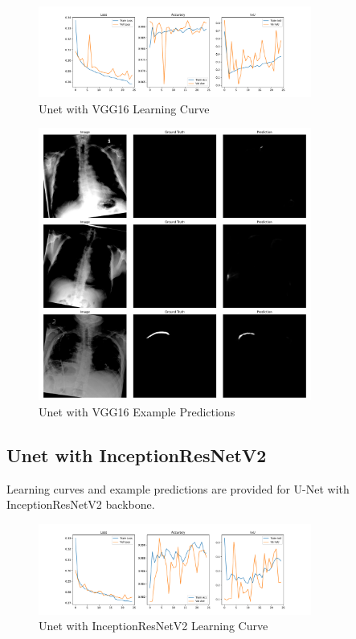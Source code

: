 \documentclass{article}
\begin{document}
\begin{figure}[H]
    \centering
    \includegraphics[width=0.8\textwidth]{plots/uvg.pdf}
    \caption{Unet with VGG16 Learning Curve}
    \label{fig:unet_vgg16}
\end{figure}

\begin{figure}[H]
    \centering
    \includegraphics[width=0.8\textwidth]{plots/uvgp.pdf}
    \caption{Unet with VGG16 Example Predictions}
    \label{fig:unet_vgg16_p}
\end{figure}

\subsection*{Unet with InceptionResNetV2}
Learning curves and example predictions are provided for U-Net with InceptionResNetV2 backbone.

\begin{figure}[H]
    \centering
    \includegraphics[width=0.8\textwidth]{plots/uinc.pdf}
    \caption{Unet with InceptionResNetV2 Learning Curve}
    \label{fig:unet_inception_resnetv2}
\end{figure}
\end{document}
